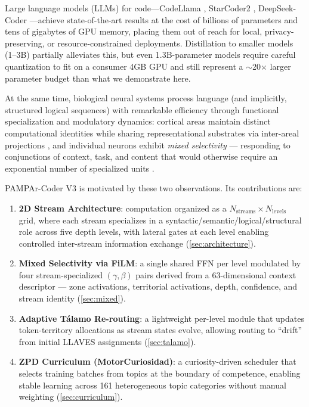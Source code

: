 \documentclass[11pt,a4paper]{article}
\begin{document}
Large language models (LLMs) for code—CodeLlama \citep{roziere2023code},
StarCoder2 \citep{lozhkov2024starcoder2}, DeepSeek-Coder
\citep{guo2024deepseek}—achieve state-of-the-art results at the cost of
billions of parameters and tens of gigabytes of GPU memory, placing them out of
reach for local, privacy-preserving, or resource-constrained deployments.
Distillation to smaller models (1–3B) partially alleviates this, but even
1.3B-parameter models require careful quantization to fit on a consumer 4GB
GPU and still represent a $\sim$20$\times$ larger parameter budget than
what we demonstrate here.

At the same time, biological neural systems process language (and implicitly,
structured logical sequences) with remarkable efficiency through functional
specialization and modulatory dynamics: cortical areas maintain distinct
computational identities while sharing representational substrates via
inter-areal projections \citep{felleman1991distributed}, and individual neurons
exhibit \emph{mixed selectivity} — responding to conjunctions of context,
task, and content that would otherwise require an exponential number of
specialized units \citep{rigotti2013importance}.

PAMPAr-Coder V3 is motivated by these two observations.  Its contributions are:

\begin{enumerate}
    \item \textbf{2D Stream Architecture}: computation organized as a
    $N_\text{streams} \times N_\text{levels}$ grid, where each stream
    specializes in a syntactic/semantic/logical/structural role across
    five depth levels, with lateral gates at each level enabling controlled
    inter-stream information exchange (\cref{sec:architecture}).

    \item \textbf{Mixed Selectivity via FiLM}: a single shared FFN per level
    modulated by four stream-specialized $(\gamma, \beta)$ pairs derived from
    a 63-dimensional context descriptor — zone activations, territorial
    activations, depth, confidence, and stream identity (\cref{sec:mixed}).

    \item \textbf{Adaptive Tálamo Re-routing}: a lightweight per-level
    module that updates token-territory allocations as stream states evolve,
    allowing routing to ``drift'' from initial LLAVES assignments
    (\cref{sec:talamo}).

    \item \textbf{ZPD Curriculum (MotorCuriosidad)}: a curiosity-driven
    scheduler that selects training batches from topics at the boundary of
    competence, enabling stable learning across 161 heterogeneous topic
    categories without manual weighting (\cref{sec:curriculum}).
\end{enumerate}
\end{document}
